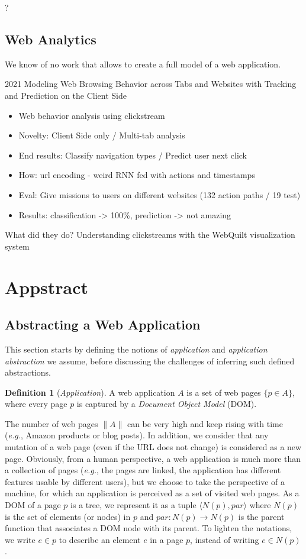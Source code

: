 \documentclass[sigconf,authordraft]{acmart}
\theoremstyle{definition}
\newtheorem{defn}{Definition}[section]
\begin{document}
?


\subsection{Web Analytics}
We know of no work that allows to create a full model of a web application.

2021 Modeling Web Browsing Behavior across Tabs and Websites with Tracking and Prediction on the Client Side~\cite{Ou2021ModelingSide}

\begin{itemize}
\item Web behavior analysis using clickstream
\item Novelty: Client Side only / Multi-tab analysis
\item End results: Classify navigation types / Predict user next click
\item How: url encoding - weird RNN fed with actions and timestamps
\item Eval: Give missions to users on different websites (132 action paths / 19 test)
\item Results: classification -> 100\%, prediction -> not amazing
\end{itemize}

What did they do? Understanding clickstreams with the WebQuilt visualization system~\cite{Ou2021ModelingSide}



\section{Appstract}\label{sec:appstract}
\subsection{Abstracting a Web Application}
This section starts by defining the notions of \emph{application} and \emph{application abstraction} we assume, before discussing the challenges of inferring such defined abstractions.

\begin{defn}[\em Application]
A web application $A$ is a set of web pages $\{p \in A\}$, where every page $p$ is captured by a \emph{Document Object Model} (DOM).
\end{defn}

The number of web pages $\|A\|$ can be very high and keep rising with time (\emph{e.g.}, Amazon products or blog posts).
In addition, we consider that any mutation of a web page (even if the URL does not change) is considered as a new page.
Obviously, from a human perspective, a web application is much more than a collection of pages (\emph{e.g.}, the pages are linked, the application has different features usable by different users), but we choose to take the perspective of a machine, for which an application is perceived as a set of visited web pages.
% 
As a DOM of a page $p$ is a tree, we represent it as a tuple $\langle N(p), par \rangle$ where $N(p)$ is the set of elements (or nodes) in $p$ and $par: N(p) \to N(p)$ is the parent function that associates a DOM node with its parent.
To lighten the notations, we write $e \in p$ to describe an element $e$ in a page $p$, instead of writing $e \in N(p)$.
\end{document}
